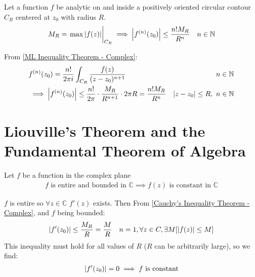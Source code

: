 \documentclass[12pt, english]{book}
\makeatletter
\renewenvironment{proof}[1][\proofname]{\par
	\pushQED{\qed}%
	\normalfont \topsep6\p@\@plus6\p@\relax
	\list{}{%
		\settowidth{\leftmargin}{\itshape\proofname:\hskip\labelsep}%
		\setlength{\labelwidth}{0pt}%
		\setlength{\itemindent}{-\leftmargin}%
	}%
	\item[\hskip\labelsep\itshape#1\@addpunct{:}]\ignorespaces
}{%
	\popQED\endlist\@endpefalse
}
\makeatother
\begin{document}
	\begin{theorem}
		\label{Cauchy's Inequality Theorem - Complex}
		Let a function \(f\) be analytic on and inside a positively oriented circular contour \(C_R\) centered at \(z_0\) with radius \(R\). 
		\begin{align*}
			M_R = \eval{\max\abs{f(z)}}_{C_R} &\implies \abs{f^{(n)}(z_0)} \leq \frac{n! M_R}{R^n}
				& n \in \mathbb{N}
		\end{align*}
	\end{theorem}
	\begin{proof}
		From \cref{ML Inequality Theorem - Complex}:
		\begin{align*}
			&f^{(n)}(z_0) = \frac{n!}{2\pi i} \int_{C_R} \frac{f(z)}{(z-z_0)^{n+1}} & n \in \mathbb{N}\\
			&\implies \abs{f^{(n)}(z_0)} \leq \frac{n!}{2\pi} \cdot \frac{M_R}{R^{n+1}} \cdot 2 \pi R = \frac{n! M_R}{R^n} & \abs{z-z_0}\leq R, \  n \in \mathbb{N}
		\end{align*}
	\end{proof}
	
	\section{Liouville's Theorem and the Fundamental Theorem of Algebra} \label{Liouville's Theorem and the Fundamental Theorem of Algebra Section - Complex}
	
	\begin{theorem}
		\label{Liouville's Theorem - Complex}
		Let \(f\) be a function in the complex plane
		\begin{align*}
			f \text{ is entire and bounded in } \mathbb{C} 
			\implies f(z) \text{ is constant in } \mathbb{C}
		\end{align*}
	\end{theorem}
	\begin{proof}
		\(f\) is entire so \(\forall z \in \mathbb{C}\) \(f'(z)\) exists. Then From \cref{Cauchy's Inequality Theorem - Complex}, and \(f\) being bounded:
		\begin{align*}
			\abs{f'(z_0)} &\leq \frac{M_R}{R} = \frac{M}{R}&  n=1, \forall z \in C,\exists M[\abs{f(z)} \leq M]
		\end{align*}
		This inequality must hold for all values of \(R\) (\(R\) can be arbitrarily large), so we find: 
		\begin{align*}
			\abs{f'(z_0)} = 0 \implies f \text{ is constant}
		\end{align*}
	\end{proof}
	
\end{document}
